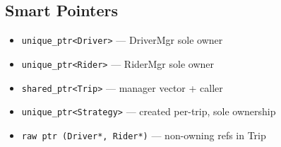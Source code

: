 \documentclass[11pt,a4paper]{article}
\begin{document}
\subsection{Smart Pointers}
\begin{itemize}
    \item \texttt{unique\_ptr<Driver>} --- DriverMgr sole owner
    \item \texttt{unique\_ptr<Rider>} --- RiderMgr sole owner
    \item \texttt{shared\_ptr<Trip>} --- manager vector + caller
    \item \texttt{unique\_ptr<Strategy>} --- created per-trip, sole ownership
    \item \texttt{raw ptr (Driver*, Rider*)} --- non-owning refs in Trip
\end{itemize}

\newpage
\end{document}
